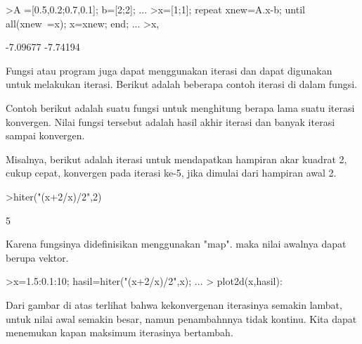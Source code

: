 \documentclass[a4paper,10pt]{article}
\begin{document}
\begin{eulernotebook}
\begin{eulercomment}
\begin{eulercomment}
\begin{eulercomment}
\begin{eulercomment}
\begin{eulercomment}
\begin{eulercomment}
\begin{eulerprompt}
>A =[0.5,0.2;0.7,0.1]; b=[2;2]; ...
>x=[1;1]; repeat xnew=A.x-b; until all(xnew~=x); x=xnew; end; ...
>x,
\end{eulerprompt}
\begin{euleroutput}
       -7.09677 
       -7.74194 
\end{euleroutput}
\begin{eulercomment}
Fungsi atau program juga dapat menggunakan iterasi dan dapat digunakan untuk melakukan iterasi. Berikut adalah beberapa contoh
iterasi di dalam fungsi.

Contoh berikut adalah suatu fungsi untuk menghitung berapa lama suatu iterasi konvergen. Nilai fungsi tersebut adalah hasil akhir
iterasi dan banyak iterasi sampai konvergen.
\end{eulercomment}
\begin{eulercomment}
Misalnya, berikut adalah iterasi untuk mendapatkan hampiran akar kuadrat 2, cukup cepat,
konvergen pada iterasi ke-5, jika dimulai dari hampiran awal 2.
\end{eulercomment}
\begin{eulerprompt}
>hiter("(x+2/x)/2",2)
\end{eulerprompt}
\begin{euleroutput}
  5
\end{euleroutput}
\begin{eulercomment}
Karena fungsinya didefinisikan menggunakan "map". maka nilai awalnya dapat berupa vektor.
\end{eulercomment}
\begin{eulerprompt}
>x=1.5:0.1:10; hasil=hiter("(x+2/x)/2",x); ...
>  plot2d(x,hasil):
\end{eulerprompt}
\begin{eulercomment}
Dari gambar di atas terlihat bahwa kekonvergenan iterasinya semakin lambat, untuk nilai awal
semakin besar, namun penambahnnya tidak kontinu. Kita dapat menemukan kapan maksimum
iterasinya bertambah.
\end{eulercomment}

\end{eulercomment}
\end{eulercomment}
\end{eulercomment}
\end{eulercomment}
\end{eulercomment}
\end{eulercomment}
\end{eulernotebook}
\end{document}
